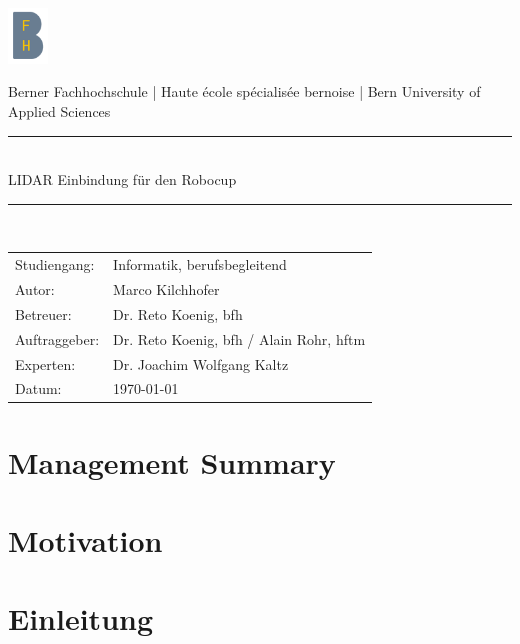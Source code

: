 \documentclass[11pt,english,german]{report}
\begin{document}
\begin{titlepage}
\begin{center}
	
\includegraphics[width=0.08\textwidth]{img/logo/bfh_logo.png}

Berner Fachhochschule | Haute école spécialisée bernoise | Bern University of Applied Sciences
\vspace{20mm}

\newcommand{\HRule}{\rule{\linewidth}{0.3mm}}
\HRule \\[0.4cm]
{\huge LIDAR Einbindung für den Robocup}\\[0.3cm]
{\huge \bfseries  }
\HRule \\[2cm]


\vfill
\end{center}
\begin{tabular}{ll}
	Studiengang:  & Informatik, berufsbegleitend \\
	Autor:        & Marco Kilchhofer \\
	Betreuer:     & Dr. Reto Koenig, \acrshort{bfh}\\
	Auftraggeber: & Dr. Reto Koenig, \acrshort{bfh} / Alain Rohr, \acrshort{hftm}\\
	Experten:     & Dr. Joachim Wolfgang Kaltz\\
	Datum:        & \today\\
\end{tabular}

\end{titlepage}



\tableofcontents

\chapter*{Management Summary}


\chapter*{Motivation}



\chapter{Einleitung}
\end{document}
